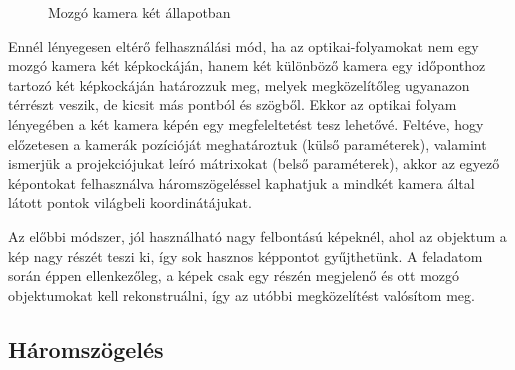 \begin{figure}[tbh]
\caption{Mozgó kamera két állapotban \label{fig:triangulation}}
\end{figure}

Ennél lényegesen eltérő felhasználási mód, ha az optikai-folyamokat nem egy mozgó kamera két képkockáján, hanem két különböző kamera egy időponthoz tartozó két képkockáján határozzuk meg, melyek megközelítőleg ugyanazon térrészt veszik, de kicsit más pontból és szögből. Ekkor az optikai folyam lényegében a két kamera képén egy megfeleltetést tesz lehetővé. Feltéve, hogy előzetesen a kamerák pozícióját meghatároztuk (külső paraméterek), valamint ismerjük a projekciójukat leíró mátrixokat (belső paraméterek), akkor az egyező képontokat felhasználva háromszögeléssel kaphatjuk a mindkét kamera által látott pontok világbeli koordinátájukat.

Az előbbi módszer, jól használható nagy felbontású képeknél, ahol az objektum a kép nagy részét teszi ki, így sok hasznos képpontot gyűjthetünk. A feladatom során éppen ellenkezőleg, a képek csak egy részén megjelenő és ott mozgó objektumokat kell rekonstruálni, így az utóbbi megközelítést valósítom meg.


\subsection{Háromszögelés \label{sec:triangulation}}

